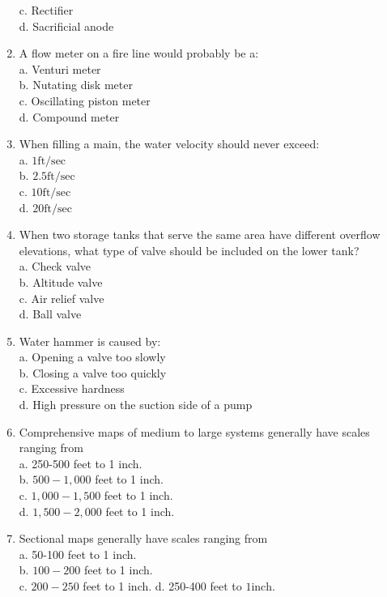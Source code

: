 \begin{enumerate}[1.]
c. Rectifier\\
d. Sacrificial anode\\
\item A flow meter on a fire line would probably be a:\\
a. Venturi meter\\
b. Nutating disk meter\\
c. Oscillating piston meter\\
d. Compound meter\\
\item When filling a main, the water velocity should never exceed:\\
a. $1 \mathrm{ft} / \mathrm{sec}$\\
b. $2.5 \mathrm{ft} / \mathrm{sec}$\\
c. $10 \mathrm{ft} / \mathrm{sec}$\\
d. $20 \mathrm{ft} / \mathrm{sec}$\\
\item When two storage tanks that serve the same area have different overflow elevations, what type of valve should be included on the lower tank?\\
a. Check valve\\
b. Altitude valve\\
c. Air relief valve\\
d. Ball valve\\
\item Water hammer is caused by:\\
a. Opening a valve too slowly\\
b. Closing a valve too quickly\\
c. Excessive hardness\\
d. High pressure on the suction side of a pump\\
\item Comprehensive maps of medium to large systems generally have scales ranging from\\
a. 250-500 feet to 1 inch.\\
b. $500-1,000$ feet to 1 inch.\\
c. $1,000-1,500$ feet to 1 inch.\\
d. $1,500-2,000$ feet to 1 inch.\\
\item Sectional maps generally have scales ranging from\\
a. 50-100 feet to 1 inch.\\
b. $100-200$ feet to 1 inch.\\
c. $200-250$ feet to 1 inch. d. 250-400 feet to $1 \mathrm{inch}$.\\

\end{enumerate}
